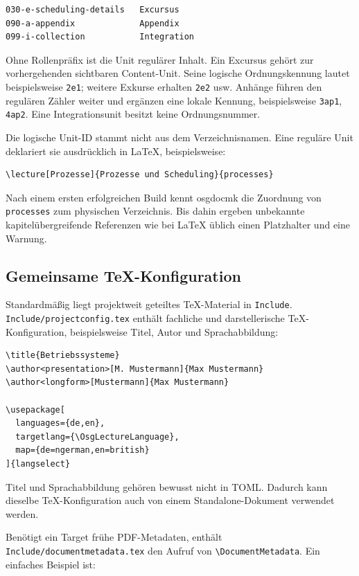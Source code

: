 \documentclass[
load-preamble+
]{osgdoc}
\begin{document}
\begin{verbatim}
030-e-scheduling-details   Excursus
090-a-appendix             Appendix
099-i-collection           Integration
\end{verbatim}

Ohne Rollenpräfix ist die Unit regulärer Inhalt. Ein Excursus gehört zur
vorhergehenden sichtbaren Content-Unit. Seine logische Ordnungskennung lautet
beispielsweise \texttt{2e1}; weitere Exkurse erhalten \texttt{2e2} usw.
Anhänge führen den regulären Zähler weiter und ergänzen eine lokale Kennung,
beispielsweise \texttt{3ap1}, \texttt{4ap2}. Eine Integrationsunit besitzt
keine Ordnungsnummer.

Die logische Unit-ID stammt nicht aus dem Verzeichnisnamen. Eine reguläre Unit
deklariert sie ausdrücklich in LaTeX, beispielsweise:

\begin{verbatim}
\lecture[Prozesse]{Prozesse und Scheduling}{processes}
\end{verbatim}

Nach einem ersten erfolgreichen Build kennt osgdocmk die Zuordnung von
\texttt{processes} zum physischen Verzeichnis. Bis dahin ergeben unbekannte
kapitelübergreifende Referenzen wie bei LaTeX üblich einen Platzhalter und
eine Warnung.

\subsection{Gemeinsame TeX-Konfiguration}

Standardmäßig liegt projektweit geteiltes TeX-Material in \texttt{Include}.
\texttt{Include/projectconfig.tex} enthält fachliche und darstellerische
TeX-Konfiguration, beispielsweise Titel, Autor und Sprachabbildung:

\begin{verbatim}
\title{Betriebssysteme}
\author<presentation>[M. Mustermann]{Max Mustermann}
\author<longform>[Mustermann]{Max Mustermann}

\usepackage[
  languages={de,en},
  targetlang={\OsgLectureLanguage},
  map={de=ngerman,en=british}
]{langselect}
\end{verbatim}

Titel und Sprachabbildung gehören bewusst nicht in TOML. Dadurch kann dieselbe
TeX-Konfiguration auch von einem Standalone-Dokument verwendet werden.

Benötigt ein Target frühe PDF-Metadaten, enthält
\texttt{Include/documentmetadata.tex} den Aufruf von
\verb|\DocumentMetadata|. Ein einfaches Beispiel ist:
\end{document}
